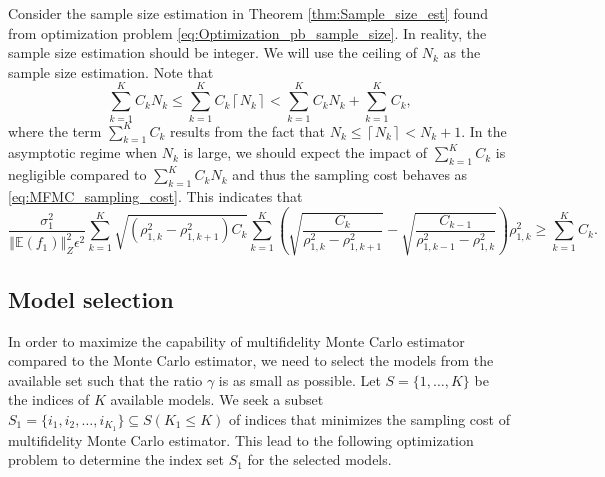 \documentclass[final,3p,times,11pt]{elsarticle}
\begin{document}
Consider the  sample size estimation in Theorem \ref{thm:Sample_size_est} found from optimization problem \ref{eq:Optimization_pb_sample_size}. In reality, the sample size estimation should be integer. We will use the ceiling of $N_k$ as the sample size estimation. Note that 
\[
\sum_{k=1}^K C_kN_k\le \sum_{k=1}^K C_k \left\lceil N_k\right\rceil<\sum_{k=1}^K C_kN_k + \sum_{k=1}^K C_k,
\]
where the term $\sum_{k=1}^K C_k$ results from the fact that $N_k\le \left\lceil N_k\right\rceil< N_k+1$. In the asymptotic regime when $N_k$ is large, we should expect the impact of $\sum_{k=1}^K C_k$ is negligible compared to $\sum_{k=1}^K C_kN_k$ and thus the sampling cost behaves as \eqref{eq:MFMC_sampling_cost}. This indicates that 
\begin{equation}\label{eq:Asymptotic_cost_constraint}
    \frac{\sigma_1^2}{\left\Vert\mathbb{E}(f_1) \right\Vert_{Z}^2\epsilon^2}\sum_{k=1}^K\sqrt{\left(\rho_{1,k}^2 - \rho_{1,k+1}^2\right)C_k}\sum_{k=1}^K\left(\sqrt{\frac{C_k}{\rho_{1,k}^2 - \rho_{1,k+1}^2}} - \sqrt{\frac{C_{k-1}}{\rho_{1,{k-1}}^2 - \rho_{1,k}^2}}\right)\rho_{1,k}^2\ge \sum_{k=1}^K C_k.
\end{equation}

\subsection{Model selection}
In order to maximize the capability of multifidelity Monte Carlo estimator  compared to the Monte Carlo estimator, we need to select the models from the available set such that the ratio $\gamma$ is as small as possible. Let $S=\{1, \ldots, K\}$ be the indices of $K$ available models. We seek a subset $S_1=\{i_1,i_2, \ldots,i_{K_1}\}\subseteq S (K_1\le K)$ of indices that minimizes the sampling cost of multifidelity Monte Carlo estimator. This lead to the following optimization problem to determine the index set $S_1$ for the selected models.
\end{document}
